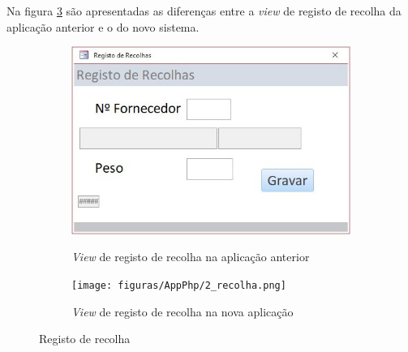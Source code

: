 Na figura \ref{fig:comparacao_recolha} são apresentadas as diferenças entre a \textit{view} de registo de recolha da aplicação anterior e o do novo sistema.
\begin{figure}[H]
	\centering
	
	\begin{subfigure}[t]{0.35\linewidth}
		\includegraphics[width=\linewidth]{figuras/AppAccess/2-Recolha.jpg}
		\label{fig:comparacao_recolha_1}
		\caption{\textit{View} de registo de recolha na aplicação anterior}
	\end{subfigure}
	\begin{subfigure}[t]{0.55\linewidth}
		\texttt{[image: figuras/AppPhp/2\_recolha.png]}
		\label{fig:comparacao_recolha_2}
		\caption{\textit{View} de registo de recolha na nova aplicação}
	\end{subfigure}
	
	\caption{Registo de recolha}
	\label{fig:comparacao_recolha}
\end{figure}

